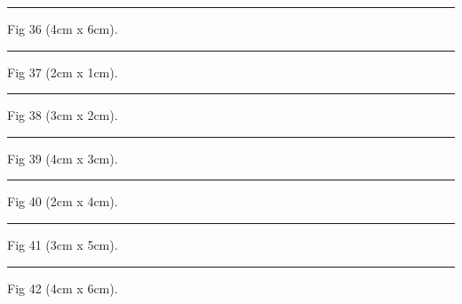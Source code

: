\documentclass[a4paper,11pt]{article}
\begin{document}
\begin{swarmwrap}%
  \begin{minipage}[t]{4cm}
    \centering
    \rule{\linewidth}{6cm}
    {\footnotesize Fig 36 (4cm x 6cm).}
  \end{minipage}%
\end{swarmwrap}%
\swarmwrapnext
\lipsum[36]%

\begin{swarmwrap}%
  \begin{minipage}[t]{2cm}
    \centering
    \rule{\linewidth}{1cm}
    {\footnotesize Fig 37 (2cm x 1cm).}
  \end{minipage}%
\end{swarmwrap}%
\swarmwrapnext
\lipsum[37]%

\begin{swarmwrap}%
  \begin{minipage}[t]{3cm}
    \centering
    \rule{\linewidth}{2cm}
    {\footnotesize Fig 38 (3cm x 2cm).}
  \end{minipage}%
\end{swarmwrap}%
\swarmwrapnext
\lipsum[38]%

\begin{swarmwrap}%
  \begin{minipage}[t]{4cm}
    \centering
    \rule{\linewidth}{3cm}
    {\footnotesize Fig 39 (4cm x 3cm).}
  \end{minipage}%
\end{swarmwrap}%
\swarmwrapnext
\lipsum[39]%

\begin{swarmwrap}%
  \begin{minipage}[t]{2cm}
    \centering
    \rule{\linewidth}{4cm}
    {\footnotesize Fig 40 (2cm x 4cm).}
  \end{minipage}%
\end{swarmwrap}%
\swarmwrapnext
\lipsum[40]%

\begin{swarmwrap}%
  \begin{minipage}[t]{3cm}
    \centering
    \rule{\linewidth}{5cm}
    {\footnotesize Fig 41 (3cm x 5cm).}
  \end{minipage}%
\end{swarmwrap}%
\swarmwrapnext
\lipsum[41]%

\begin{swarmwrap}%
  \begin{minipage}[t]{4cm}
    \centering
    \rule{\linewidth}{6cm}
    {\footnotesize Fig 42 (4cm x 6cm).}
  \end{minipage}%
\end{swarmwrap}%
\swarmwrapnext
\lipsum[42]%
\end{document}

